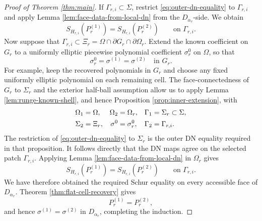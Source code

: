 \documentclass[11pt,oneside]{article}
\begin{document}
\begin{proof}[Proof of Theorem \ref{thm:main}]
If \(\Gamma_{r,i}\subset\Sigma\), restrict
\eqref{eq:outer-dn-equality} to \(\Gamma_{r,i}\) and apply Lemma
\ref{lem:face-data-from-local-dn} from the \(D_{\alpha_r}\)-side.  We obtain
\begin{equation}
  S_{H_{r,i}}(P_r^{(1)})
  =
  S_{H_{r,i}}(P_r^{(2)})
  \qquad\text{on }\Gamma_{r,i}.
  \label{eq:exterior-face-data}
\end{equation}
Now suppose that
\(\Gamma_{r,i}\subset\Xi_r=\Omega\cap\partial G_r\cap\partial\Omega_r\).
Extend the known coefficient on \(G_r\) to a uniformly elliptic piecewise
polynomial coefficient \(\sigma^0_r\) on \(\Omega\), so that
\begin{equation}
  \sigma^0_r=\sigma^{(1)}=\sigma^{(2)}
  \quad\text{in }G_r .
\end{equation}
For example, keep the recovered polynomials in \(G_r\) and choose any fixed
uniformly elliptic polynomial on each remaining cell.  The face-connectedness
of \(G_r\) to \(\Sigma_r\) and the exterior half-ball assumption allow us to
apply Lemma \ref{lem:runge-known-shell}, and hence Proposition
\ref{prop:inner-extension}, with
\begin{align}
  \Omega_1&=\Omega,&
  \Omega_2&=\Omega_r,&
  \Gamma_1&=\Sigma_r\subset\Sigma,\notag\\
  \Sigma_2&=\Xi_r,&
  \sigma^0&=\sigma^0_r,&
  \Gamma_2&=\Gamma_{r,i} .
\end{align}
The restriction of \eqref{eq:outer-dn-equality} to \(\Sigma_r\) is the outer
DN equality required in that proposition.  It follows directly that the DN
maps agree on the selected patch \(\Gamma_{r,i}\).  Applying Lemma
\ref{lem:face-data-from-local-dn} in \(\Omega_r\) gives
\begin{equation}
  S_{H_{r,i}}(P_r^{(1)})
  =
  S_{H_{r,i}}(P_r^{(2)})
  \qquad\text{on }\Gamma_{r,i}.
  \label{eq:interior-face-data}
\end{equation}
We have therefore obtained the required Schur equality on every accessible
face of \(D_{\alpha_r}\).  Theorem \ref{thm:flat-cell-recovery} gives
\begin{equation}
  P_r^{(1)}=P_r^{(2)},
\end{equation}
and hence \(\sigma^{(1)}=\sigma^{(2)}\) in \(D_{\alpha_r}\), completing the
induction.
\end{proof}
\end{document}
